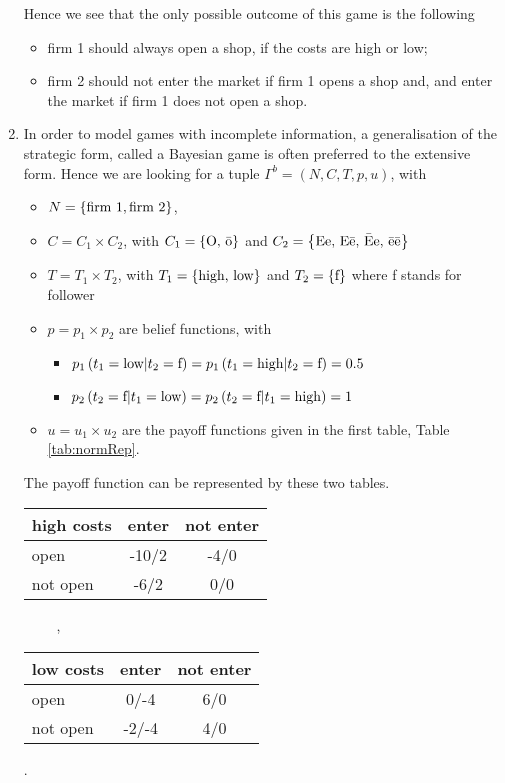 \begin{enumerate}[label=\alph*.]
	      Hence we see that the only possible outcome of this game is the following
	      \begin{itemize}
	      	\item firm 1 should always open a shop, if the costs are high or low;
	      	\item firm 2 should not enter the market if firm 1 opens a shop and, and enter the market if firm 1 does not open a shop.
	      \end{itemize}

	\item In order to model games with incomplete information, a generalisation of the strategic form, called a Bayesian game is often preferred to the extensive form. Hence we are looking for a tuple $\Gamma^b = (N,C,T,p,u)$, with
	      \begin{itemize}
	      	\item $N = \left\{\text{firm 1}, \text{firm 2}\right\}$,
	      	\item $C = C_1 \times C_2$, with $C_1 = \left\{\text{O, \=o}\right\}$ and $C_2 = \left\{\text{Ee, E\=e, \=Ee, \=e\=e}\right\}$
	      	\item $T = T_1 \times T_2$, with $T_1 = \left\{\text{high, low}\right\}$ and $T_2 = \left\{\text{f}\right\}$ where f stands for follower
	      	\item $p = p_1 \times p_2$ are belief functions, with
	      	      \begin{itemize}
	      	      	\item $p_1 \left(t_1 = \text{low} | t_2 = \text{f}\right) = p_1 \left(t_1 = \text{high} | t_2 = \text{f}\right) = 0.5 $
	      	      	\item $p_2 \left( t_2 = \text{f} | t_1 = \text{low}\right) = p_2 \left( t_2 = \text{f} | t_1 = \text{high}\right) = 1 $
	      	      \end{itemize}
	      	\item $u = u_1 \times u_2$ are the payoff functions given in the first table, Table \ref{tab:normRep}.

	      \end{itemize}
				
				The payoff function can be represented by these two tables.
			 
			 \begin{center}
				 \begin{tabular}{l|cc}
					 		high costs & enter & not enter \\
					 		\hline
					 		open        & -10/2 & -4/0 \\
					 		not open    & -6/2  &  0/0 \\
				 \end{tabular}
				 $\qquad$
				 ,
				 $\qquad$
				 \begin{tabular}{l|cc}
					 		low costs & enter & not enter \\
					 		\hline
					 		open        & 0/-4  & 6/0 \\
					 		not open    & -2/-4 & 4/0 \\
				 \end{tabular}
				 .
			 \end{center}


\end{enumerate}
